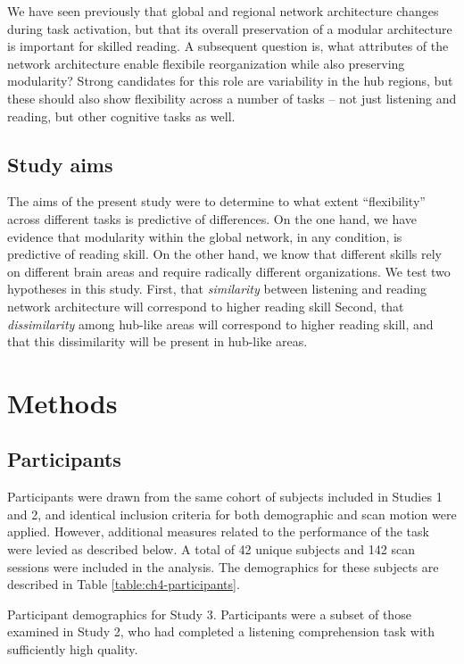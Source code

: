 We have seen previously that global and regional network architecture changes during task activation, but that its overall preservation of a modular architecture is important for skilled reading. A subsequent question is, what attributes of the network architecture enable flexibile reorganization while also preserving modularity? Strong candidates for this role are variability in the hub regions, but these should also show flexibility across a number of tasks -- not just listening and reading, but other cognitive tasks as well. 

\subsection{Study aims}

The aims of the present study were to determine to what extent ``flexibility'' across different tasks is predictive of differences. On the one hand, we have evidence that modularity within the global network, in any condition, is predictive of reading skill. On the other hand, we know that different skills rely on different brain areas and require radically different organizations. We test two hypotheses in this study. First, that \textit{similarity} between listening and reading network architecture will correspond to higher reading skill Second, that \textit{dissimilarity} among hub-like areas will correspond to higher reading skill, and that this dissimilarity will be present in hub-like areas. 

\section{Methods}

\subsection{Participants}

Participants were drawn from the same cohort of subjects included in Studies 1 and 2, and identical inclusion criteria for both demographic and scan motion were applied. However, additional measures related to the performance of the task were levied as described below. A total of 42 unique subjects and 142 scan sessions were included in the analysis. The demographics for these subjects are described in Table \ref{table:ch4-participants}.

\begin{table}[t]
	\renewcommand{\tabcolsep}{0.09cm}
	\centering
	
	\caption[Participant demographics for Study 3.]{Participant demographics for Study 3. Participants were a subset of those examined in Study 2, who had completed a listening comprehension task with sufficiently high quality.}
	\label{table:ch4-participants}
\end{table}

